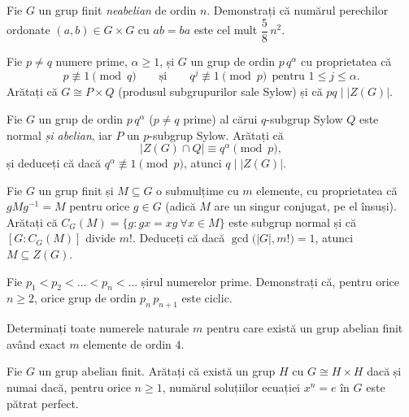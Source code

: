 \begin{problema}[Clasică]
Fie $G$ un grup finit \emph{neabelian} de ordin $n$. Demonstrați că
numărul perechilor ordonate $(a,b)\in G\times G$ cu $ab=ba$ este cel mult
$\dfrac{5}{8}\,n^{2}$.
\end{problema}

\begin{problema}
Fie $p\neq q$ numere prime, $\alpha\ge 1$, și $G$ un grup de ordin
$p\,q^{\alpha}$ cu proprietatea că
\[
  p\not\equiv 1\pmod q\qquad\text{și}\qquad q^{j}\not\equiv 1\pmod p
  \ \ \text{pentru }1\le j\le\alpha .
\]
Arătați că $G\cong P\times Q$ (produsul subgrupurilor sale Sylow)
și că $pq\mid|Z(G)|$.
\end{problema}

\begin{problema}
Fie $G$ un grup de ordin $p\,q^{\alpha}$ ($p\neq q$ prime) al cărui
$q$-subgrup Sylow $Q$ este normal \emph{și abelian}, iar $P$ un
$p$-subgrup Sylow. Arătați că
\[
  |Z(G)\cap Q|\equiv q^{\alpha}\pmod p,
\]
și deduceți că dacă $q^{\alpha}\not\equiv 1\pmod p$, atunci
$q\mid|Z(G)|$.
\end{problema}

\begin{problema}
Fie $G$ un grup finit și $M\subseteq G$ o submulțime cu $m$ elemente,
cu proprietatea că $gMg^{-1}=M$ pentru orice $g\in G$ (adică $M$ are
un singur conjugat, pe el însuși). Arătați că
$C_{G}(M)=\{g:gx=xg\ \forall x\in M\}$ este subgrup normal și că
$[G:C_{G}(M)]$ divide $m!$. Deduceți că dacă
$\gcd\bigl(|G|,m!\bigr)=1$, atunci $M\subseteq Z(G)$.
\end{problema}

\begin{problema}
Fie $p_{1}<p_{2}<\dots<p_{n}<\dots$ șirul numerelor prime. Demonstrați
că, pentru orice $n\ge 2$, orice grup de ordin $p_{n}\,p_{n+1}$ este
ciclic.
\end{problema}

\begin{problema}
Determinați toate numerele naturale $m$ pentru care există un grup
abelian finit având exact $m$ elemente de ordin $4$.
\end{problema}

\begin{problema}
Fie $G$ un grup abelian finit. Arătați că există un grup $H$
cu $G\cong H\times H$ dacă și numai dacă, pentru orice $n\ge 1$,
numărul soluțiilor ecuației $x^{n}=e$ în $G$ este pătrat
perfect.
\end{problema}

